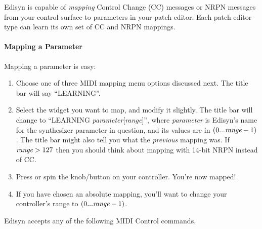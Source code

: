 \documentclass{article}
\begin{document}
Edisyn is capable of {\it mapping} Control Change (CC) messages or NRPN messages from your control surface to parameters in your patch editor.  Each patch editor type can learn its own set of CC and NRPN mappings.

\paragraph{Mapping a Parameter}

Mapping a parameter is easy:

\begin{enumerate}
\item Choose one of three MIDI mapping menu options discussed next.  The title bar will say ``LEARNING''.
\item Select the widget you want to map, and modify it slightly.  The title bar will change to ``LEARNING {\it parameter}[{\it range}]'', where {\it parameter} is Edisyn's name for the synthesizer parameter in question, and its values are in  \((0...\text{\it range}-1)\).  The title bar might also tell you what the {\it previous} mapping was.  If \(\text{\it range} > 127\) then you should think about mapping with 14-bit NRPN instead of CC. 
\item Press or spin the knob/button on your controller.  You're now mapped!
\item If you have chosen an absolute mapping, you'll want to change your controller's range to \((0...\text{\it range}-1)\).
\end{enumerate}

\noindent Edisyn accepts any of the following MIDI Control commands.  
\end{document}
